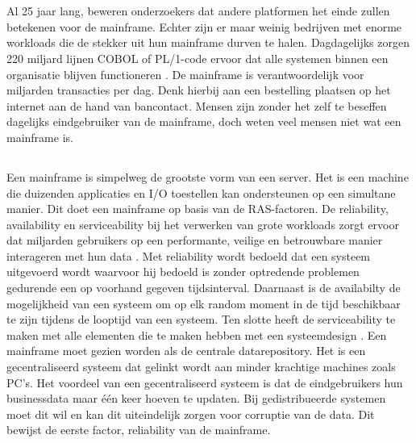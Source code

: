 
\chapter{}
\label{ch:inleiding}
Al 25 jaar lang, beweren onderzoekers dat andere platformen het einde zullen betekenen voor de mainframe. Echter zijn er maar weinig bedrijven met enorme workloads die de stekker uit hun mainframe durven te halen. Dagdagelijks zorgen 220 miljard lijnen COBOL of PL/1-code ervoor dat alle systemen binnen een organisatie blijven functioneren \autocite{Scannell2017}. De mainframe is verantwoordelijk voor miljarden transacties per dag. Denk hierbij aan een bestelling plaatsen op het internet aan de hand van bancontact. Mensen zijn zonder het zelf te beseffen dagelijks eindgebruiker van de mainframe, doch weten veel mensen niet wat een mainframe is. 

\section{}

Een mainframe is simpelweg de grootste vorm van een server. Het is een machine die duizenden applicaties en I/O toestellen kan ondersteunen op een simultane manier. Dit doet een mainframe op basis van de RAS-factoren. De reliability, availability en serviceability bij het verwerken van grote workloads zorgt ervoor dat miljarden gebruikers op een performante, veilige en betrouwbare manier interageren met hun data \autocite{Ebbers2022}. Met reliability wordt bedoeld dat een systeem uitgevoerd wordt waarvoor hij bedoeld is zonder optredende problemen gedurende een op voorhand gegeven tijdsinterval. Daarnaast is de availabilty de mogelijkheid van een systeem om op elk random moment in de tijd beschikbaar te zijn tijdens de looptijd van een systeem. Ten slotte heeft de serviceability te maken met alle elementen die te maken hebben met een systeemdesign \autocite{Johnson1988}.  Een mainframe moet gezien worden als de centrale datarepository. Het is een gecentraliseerd systeem dat gelinkt wordt aan minder krachtige machines zoals PC's.  Het voordeel van een gecentraliseerd systeem is dat de eindgebruikers hun businessdata maar één keer hoeven te updaten. Bij gedistribueerde systemen moet dit wil en kan dit uiteindelijk zorgen voor corruptie van de data. Dit bewijst de eerste factor, reliability van de mainframe. 

